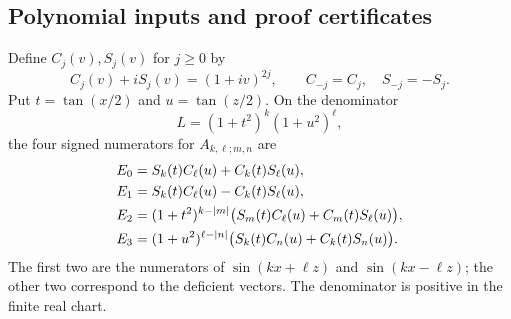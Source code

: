 \documentclass[11pt,letterpaper]{article}
\theoremstyle{definition}\newtheorem{definition}[theorem]{Definition}
\theoremstyle{remark}\newtheorem{remark}[theorem]{Remark}
\begin{document}
\subsection{Polynomial inputs and proof certificates}
Define $C_j(v),S_j(v)$ for $j\ge0$ by
\[
 C_j(v)+iS_j(v)=(1+iv)^{2j},
 \qquad C_{-j}=C_j,\quad S_{-j}=-S_j.
\]
Put $t=\tan(x/2)$ and $u=\tan(z/2)$. On the denominator
\[
 L=(1+t^2)^k(1+u^2)^\ell,
\]
the four signed numerators for $A_{k,\ell;m,n}$ are
\begin{align}
 E_0&=S_k(t)C_\ell(u)+C_k(t)S_\ell(u),\notag\\
 E_1&=S_k(t)C_\ell(u)-C_k(t)S_\ell(u),\notag\\
 E_2&=(1+t^2)^{k-|m|}\bigl(S_m(t)C_\ell(u)+C_m(t)S_\ell(u)\bigr),\label{eq:twoinputs}\\
 E_3&=(1+u^2)^{\ell-|n|}\bigl(S_k(t)C_n(u)+C_k(t)S_n(u)\bigr).\notag
\end{align}
The first two are the numerators of $\sin(kx+\ell z)$ and $\sin(kx-\ell z)$; the other two correspond to the deficient vectors. The denominator is positive in the finite real chart.
\end{document}
